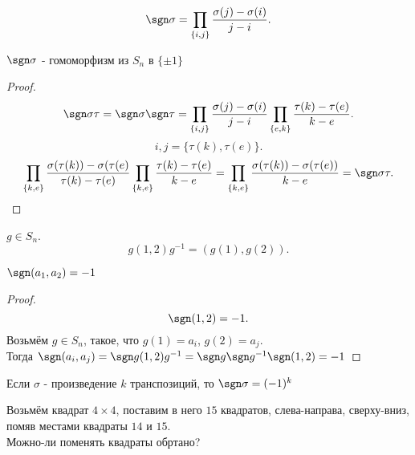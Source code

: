 \documentclass[11pt, oneside]{article}   	%
\begin{document}
    \begin{dlemma}
        \[ \sgn \sigma = \prod\limits_{\{i, j\}} \frac{\sigma(j)-\sigma(i)}{j-i}   .\] 
    \end{dlemma}
    \begin{dlemma}
        $\sgn \sigma$ - гомоморфизм из $S_n$ в $\{\pm 1\} $
        \begin{proof}
            \[ \sgn \sigma\tau = \sgn\sigma\sgn\tau = \prod\limits_{\{i,j\}} \frac{\sigma(j)-\sigma(i)}{j-i}\prod\limits_{\{e, k\}} \frac{\tau(k)-\tau(e)}{k-e}     .\]
        \[ {i, j} = \{\tau(k), \tau(e)\}   .\] 
        \[ \prod\limits_{\{k, e\} } \frac{\sigma(\tau(k))-\sigma(\tau(e)}{\tau(k)-\tau(e)}\prod\limits_{\{k, e\} }\frac{\tau(k)-\tau(e)}{k-e} = \prod\limits_{\{k, e\} } \frac{\sigma(\tau(k))-\sigma(\tau(e))}{k-e} = \sgn \sigma\tau      .\qedhere\] 
        \end{proof}
    \end{dlemma}
    \begin{dlemma}
        $g\in S_n$.\\
        \[ g(1,2)g^{-1} = (g(1),g(2)) .\] 
    \end{dlemma}
    \begin{dlemma}
        $\sgn (a_1, a_2) = -1$
        \begin{proof}
            \[ \sgn (1,2) = -1 .\]
            Возьмём $g\in S_n$, такое, что $g(1)=a_i$, $g(2)=a_j$.\\
            Тогда $\sgn(a_i, a_j) = \sgn g(1,2)g^{-1} = \sgn g\sgn g^{-1} \sgn(1,2) = -1$
        \end{proof}
    \end{dlemma}
    \begin{dlemma}
        Если $\sigma$ - произведение $k$ транспозиций, то $\sgn \sigma = (-1)^{k}$
    \end{dlemma}
    \begin{definition}[Игра в $15$]
        Возьмём квадрат $4\times 4$, поставим в него $15$ квадратов, слева-направа, сверху-вниз, помяв местами квадраты $14$ и $15$.\\
        Можно-ли поменять квадраты обртано?
    \end{definition}
\end{document}
